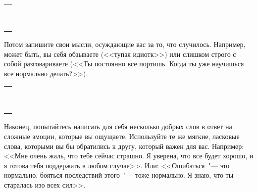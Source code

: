 \setlength{\extrarowheight}{2mm}
\begin{tabularx}{\textwidth}{X}
	\\
	\arrayrulecolor{gray}\hline\\
	\hline\\
	\hline\\
	\hline\\
	\hline\\
	\hline\\
	\hline\\
	\hline\\
	\hline\\
	\hline\\	
\end{tabularx}
\setlength{\extrarowheight}{0mm}

\begin{itemize}
	\itemWritingHand Потом запишите свои мысли, осуждающие вас за то, что случилось. Например, может быть, вы себя обзываете (<<тупая идиотк>>) или слишком строго с собой разговариваете (<<Ты постоянно все портишь. Когда ты уже научишься все нормально делать?>>).
\end{itemize}

\setlength{\extrarowheight}{2mm}
\begin{tabularx}{\textwidth}{X}
	\\
	\arrayrulecolor{gray}\hline\\
	\hline\\
	\hline\\
	\hline\\
	\hline\\
	\hline\\
	\hline\\
	\hline\\
	\hline\\
	\hline\\	
\end{tabularx}
\setlength{\extrarowheight}{0mm}

\begin{itemize}
	\itemWritingHand Наконец, попытайтесь написать для себя несколько добрых слов в ответ на сложные эмоции, которые вы ощущаете. Используйте те же мягкие, ласковые слова, которыми вы бы обратились к другу, который важен для вас. Например: <<Мне очень жаль, что тебе сейчас страшно. Я уверена, что все будет хорошо, и я готова тебя поддержать в любом случае>>. Или: <<Ошибаться~"--- это нормально, бояться последствий этого~"--- тоже нормально. Я знаю, что ты старалась изо всех сил>>.
\end{itemize}

